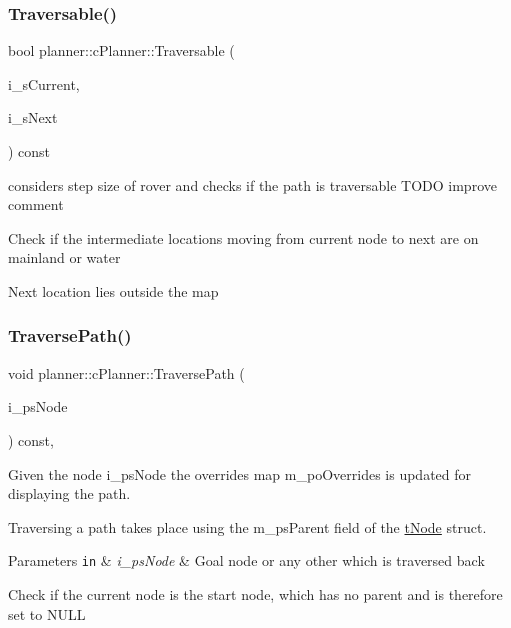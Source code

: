 \subsubsection{\texorpdfstring{Traversable()}{Traversable()}}
{\footnotesize\ttfamily bool planner\+::c\+Planner\+::\+Traversable (\begin{DoxyParamCaption}\item[{\mbox{\hyperlink{structplanner_1_1t_node}{t\+Node}} $\ast$}]{i\+\_\+s\+Current,  }\item[{\mbox{\hyperlink{structplanner_1_1t_node}{t\+Node}} $\ast$}]{i\+\_\+s\+Next }\end{DoxyParamCaption}) const}



considers step size of rover and checks if the path is traversable T\+O\+DO improve comment 

Check if the intermediate locations moving from current node to next are on mainland or water

Next location lies outside the map \mbox{\label{classplanner_1_1c_planner_ad9389067cbc3fa6fb1c2efdf3f344664}} 
\subsubsection{\texorpdfstring{Traverse\+Path()}{TraversePath()}}
{\footnotesize\ttfamily void planner\+::c\+Planner\+::\+Traverse\+Path (\begin{DoxyParamCaption}\item[{\mbox{\hyperlink{structplanner_1_1t_node}{t\+Node}} $\ast$}]{i\+\_\+ps\+Node }\end{DoxyParamCaption}) const\hspace{0.3cm}{\ttfamily [override]}, {\ttfamily [virtual]}}



Given the node i\+\_\+ps\+Node the overrides map m\+\_\+po\+Overrides is updated for displaying the path. 

Traversing a path takes place using the m\+\_\+ps\+Parent field of the \mbox{\hyperlink{structplanner_1_1t_node}{t\+Node}} struct. 
\begin{DoxyParams}[1]{Parameters}
\mbox{\tt in}  & {\em i\+\_\+ps\+Node} & Goal node or any other which is traversed back \\
\hline
\end{DoxyParams}
Check if the current node is the start node, which has no parent and is therefore set to N\+U\+LL

